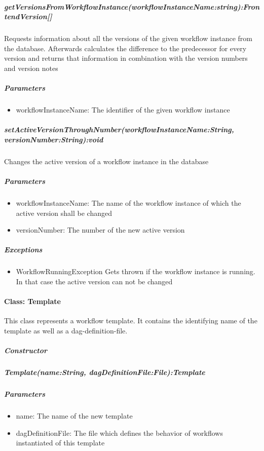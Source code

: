 \subparagraph{getVersionsFromWorkflowInstance(workflowInstanceName:string):FrontendVersion[]}
Requests information about all the versions of the given workflow instance from the database. Afterwards calculates the difference to the predecessor for every version and returns that information in combination with the version numbers and version notes

\subparagraph{Parameters}
\begin{itemize}
	\item{workflowInstanceName:}
	The identifier of the given workflow instance
\end{itemize}

\subparagraph{setActiveVersionThroughNumber(workflowInstanceName:String, versionNumber:String):void}
Changes the active version of a workflow instance in the database

\subparagraph{Parameters}
\begin{itemize}
	\item{workflowInstanceName:}
	The name of the workflow instance of which the active version shall be changed
	\item{versionNumber:}
	The number of the new active version
\end{itemize}

\subparagraph{Exceptions}
\begin{itemize}
	\item{WorkflowRunningException}
	Gets thrown if the workflow instance is running. In that case the active version can not be changed
\end{itemize}

\paragraph{Class: Template}
This class represents a workflow template. It contains the identifying name of the template as well as a dag-definition-file.
\subparagraph{Constructor}

\subparagraph{Template(name:String, dagDefinitionFile:File):Template}

\subparagraph{Parameters}
\begin{itemize}
	\item{name:}
	The name of the new template
	\item{dagDefinitionFile:}
	The file which defines the behavior of workflows instantiated of this template
\end{itemize}

